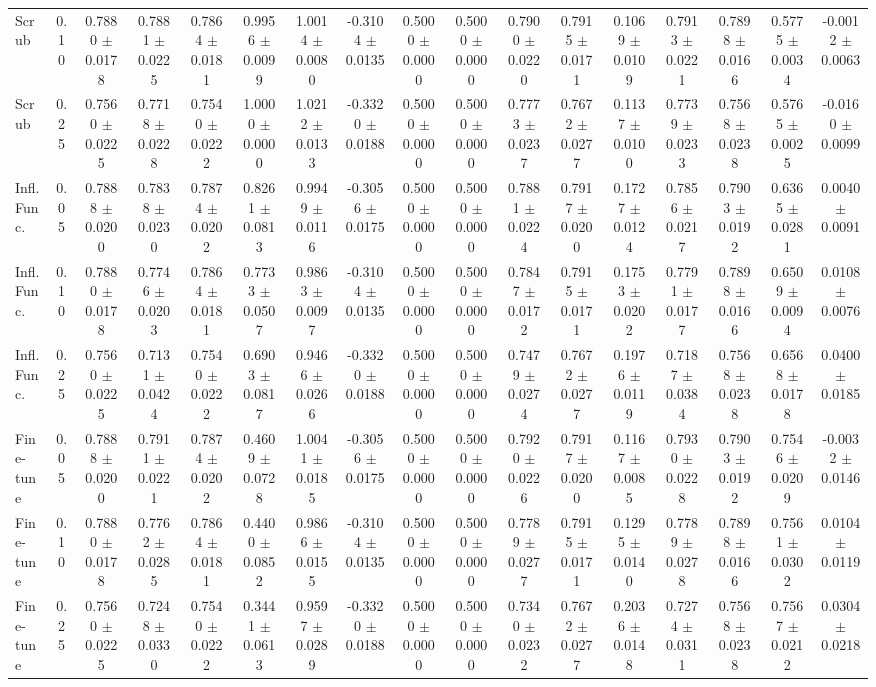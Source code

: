 \begin{table}[t]
\begin{tabular}{lcccccccccccccccc}
Scrub & 0.10 & 0.7880 $\pm$ 0.0178 & 0.7881 $\pm$ 0.0225 & 0.7864 $\pm$ 0.0181 & 0.9956 $\pm$ 0.0099 & 1.0014 $\pm$ 0.0080 & -0.3104 $\pm$ 0.0135 & 0.5000 $\pm$ 0.0000 & 0.5000 $\pm$ 0.0000 & 0.7900 $\pm$ 0.0220 & 0.7915 $\pm$ 0.0171 & 0.1069 $\pm$ 0.0109 & 0.7913 $\pm$ 0.0221 & 0.7898 $\pm$ 0.0166 & 0.5775 $\pm$ 0.0034 & -0.0012 $\pm$ 0.0063 \\
Scrub & 0.25 & 0.7560 $\pm$ 0.0225 & 0.7718 $\pm$ 0.0228 & 0.7540 $\pm$ 0.0222 & 1.0000 $\pm$ 0.0000 & 1.0212 $\pm$ 0.0133 & -0.3320 $\pm$ 0.0188 & 0.5000 $\pm$ 0.0000 & 0.5000 $\pm$ 0.0000 & 0.7773 $\pm$ 0.0237 & 0.7672 $\pm$ 0.0277 & 0.1137 $\pm$ 0.0100 & 0.7739 $\pm$ 0.0233 & 0.7568 $\pm$ 0.0238 & 0.5765 $\pm$ 0.0025 & -0.0160 $\pm$ 0.0099 \\
Infl. Func. & 0.05 & 0.7888 $\pm$ 0.0200 & 0.7838 $\pm$ 0.0230 & 0.7874 $\pm$ 0.0202 & 0.8261 $\pm$ 0.0813 & 0.9949 $\pm$ 0.0116 & -0.3056 $\pm$ 0.0175 & 0.5000 $\pm$ 0.0000 & 0.5000 $\pm$ 0.0000 & 0.7881 $\pm$ 0.0224 & 0.7917 $\pm$ 0.0200 & 0.1727 $\pm$ 0.0124 & 0.7856 $\pm$ 0.0217 & 0.7903 $\pm$ 0.0192 & 0.6365 $\pm$ 0.0281 & 0.0040 $\pm$ 0.0091 \\
Infl. Func. & 0.10 & 0.7880 $\pm$ 0.0178 & 0.7746 $\pm$ 0.0203 & 0.7864 $\pm$ 0.0181 & 0.7733 $\pm$ 0.0507 & 0.9863 $\pm$ 0.0097 & -0.3104 $\pm$ 0.0135 & 0.5000 $\pm$ 0.0000 & 0.5000 $\pm$ 0.0000 & 0.7847 $\pm$ 0.0172 & 0.7915 $\pm$ 0.0171 & 0.1753 $\pm$ 0.0202 & 0.7791 $\pm$ 0.0177 & 0.7898 $\pm$ 0.0166 & 0.6509 $\pm$ 0.0094 & 0.0108 $\pm$ 0.0076 \\
Infl. Func. & 0.25 & 0.7560 $\pm$ 0.0225 & 0.7131 $\pm$ 0.0424 & 0.7540 $\pm$ 0.0222 & 0.6903 $\pm$ 0.0817 & 0.9466 $\pm$ 0.0266 & -0.3320 $\pm$ 0.0188 & 0.5000 $\pm$ 0.0000 & 0.5000 $\pm$ 0.0000 & 0.7479 $\pm$ 0.0274 & 0.7672 $\pm$ 0.0277 & 0.1976 $\pm$ 0.0119 & 0.7187 $\pm$ 0.0384 & 0.7568 $\pm$ 0.0238 & 0.6568 $\pm$ 0.0178 & 0.0400 $\pm$ 0.0185 \\
Fine-tune & 0.05 & 0.7888 $\pm$ 0.0200 & 0.7911 $\pm$ 0.0221 & 0.7874 $\pm$ 0.0202 & 0.4609 $\pm$ 0.0728 & 1.0041 $\pm$ 0.0185 & -0.3056 $\pm$ 0.0175 & 0.5000 $\pm$ 0.0000 & 0.5000 $\pm$ 0.0000 & 0.7920 $\pm$ 0.0226 & 0.7917 $\pm$ 0.0200 & 0.1167 $\pm$ 0.0085 & 0.7930 $\pm$ 0.0228 & 0.7903 $\pm$ 0.0192 & 0.7546 $\pm$ 0.0209 & -0.0032 $\pm$ 0.0146 \\
Fine-tune & 0.10 & 0.7880 $\pm$ 0.0178 & 0.7762 $\pm$ 0.0285 & 0.7864 $\pm$ 0.0181 & 0.4400 $\pm$ 0.0852 & 0.9866 $\pm$ 0.0155 & -0.3104 $\pm$ 0.0135 & 0.5000 $\pm$ 0.0000 & 0.5000 $\pm$ 0.0000 & 0.7789 $\pm$ 0.0277 & 0.7915 $\pm$ 0.0171 & 0.1295 $\pm$ 0.0140 & 0.7789 $\pm$ 0.0278 & 0.7898 $\pm$ 0.0166 & 0.7561 $\pm$ 0.0302 & 0.0104 $\pm$ 0.0119 \\
Fine-tune & 0.25 & 0.7560 $\pm$ 0.0225 & 0.7248 $\pm$ 0.0330 & 0.7540 $\pm$ 0.0222 & 0.3441 $\pm$ 0.0613 & 0.9597 $\pm$ 0.0289 & -0.3320 $\pm$ 0.0188 & 0.5000 $\pm$ 0.0000 & 0.5000 $\pm$ 0.0000 & 0.7340 $\pm$ 0.0232 & 0.7672 $\pm$ 0.0277 & 0.2036 $\pm$ 0.0148 & 0.7274 $\pm$ 0.0311 & 0.7568 $\pm$ 0.0238 & 0.7567 $\pm$ 0.0212 & 0.0304 $\pm$ 0.0218 \\
\bottomrule
\end{tabular}
\end{table}
